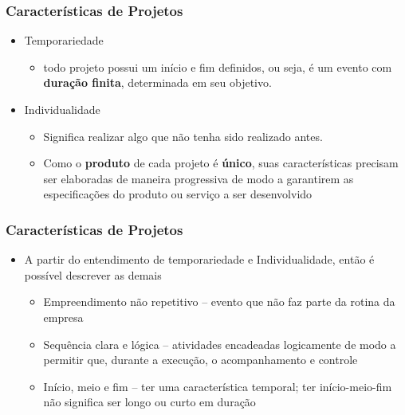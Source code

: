 \begin{frame}
 \frametitle{Características de Projetos}
 \begin{itemize}
  \item Temporariedade
  \begin{itemize}
   \item todo projeto possui um início e fim definidos, ou seja, é um evento com \textbf{duração finita}, determinada em seu objetivo.
  \end{itemize}
  \item Individualidade
  \begin{itemize}
   \item Significa realizar algo que não tenha sido realizado antes. 
    \item Como o \textbf{produto} de cada projeto é \textbf{único}, suas características precisam ser elaboradas de maneira progressiva
    de modo a garantirem as especificações do produto ou serviço a ser desenvolvido
  \end{itemize}
 \end{itemize}
  \end{frame}

  \begin{frame}
   \frametitle{Características de Projetos}
   \begin{itemize}
    \item A partir do entendimento de temporariedade e Individualidade, então é possível descrever as demais
    \begin{itemize}
     \item Empreendimento não repetitivo – evento que não faz parte da rotina da empresa
     \item Sequência clara e lógica – atividades encadeadas logicamente de modo a permitir que, durante a execução, o acompanhamento e controle
     \item Início, meio e fim – ter uma característica temporal; ter início-meio-fim não significa ser longo ou curto em duração	
    \end{itemize}
   \end{itemize}
  \end{frame}
  
